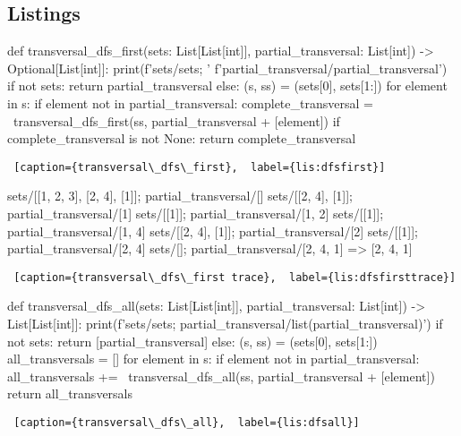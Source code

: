 \subsection{Listings}\label{sec:listings}

\begin{center}

\begin{minipage}{\linewidth}
\begin{python}[numbers=left]
def transversal_dfs_first(sets: List[List[int]],
                          partial_transversal: List[int]) 
                          -> Optional[List[int]]:
  print(f'sets/{sets}; '
        f'partial_transversal/{partial_transversal}')  
  if not sets:
    return partial_transversal
  else:
    (s, ss) = (sets[0], sets[1:])
    for element in s:
      if element not in partial_transversal:
        complete_transversal = \
          transversal_dfs_first(ss, partial_transversal + [element])
        if complete_transversal is not None:
          return complete_transversal    
\end{python}
\begin{lstlisting} [caption={transversal\_dfs\_first},  label={lis:dfsfirst}]
\end{lstlisting}
\end{minipage}


\begin{minipage}{\linewidth}

\begin{python}[numbers=left]
sets/[[1, 2, 3], [2, 4], [1]]; partial_transversal/[]
sets/[[2, 4], [1]]; partial_transversal/[1]
sets/[[1]]; partial_transversal/[1, 2]
sets/[[1]]; partial_transversal/[1, 4]
sets/[[2, 4], [1]]; partial_transversal/[2]
sets/[[1]]; partial_transversal/[2, 4]
sets/[]; partial_transversal/[2, 4, 1]
                                =>  [2, 4, 1]
\end{python}
\begin{lstlisting} [caption={transversal\_dfs\_first trace},  label={lis:dfsfirsttrace}]
\end{lstlisting}
\end{minipage}


\begin{minipage}{\linewidth}
\begin{python}[numbers=left]
def transversal_dfs_all(sets: List[List[int]],
                        partial_transversal: List[int]) 
                        -> List[List[int]]:
  print(f'sets/{sets}; partial_transversal/{list(partial_transversal)}')
  if not sets:
    return [partial_transversal]
  else:
    (s, ss) = (sets[0], sets[1:])
    all_transversals = []
    for element in s:
      if element not in partial_transversal:
        all_transversals += \
          transversal_dfs_all(ss, partial_transversal + [element])
    return all_transversals
\end{python}
\begin{lstlisting} [caption={transversal\_dfs\_all},  label={lis:dfsall}]
\end{lstlisting}
\end{minipage}



\end{center}
